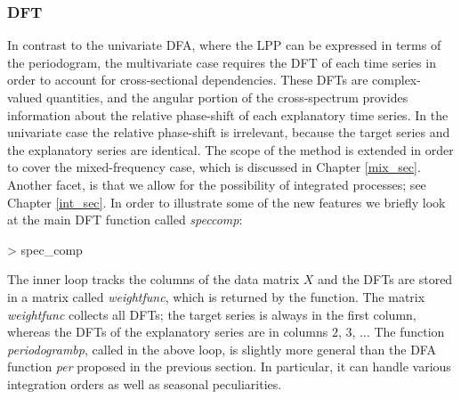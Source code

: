 \documentclass[a4paper]{book}
\begin{document}
\subsubsection{DFT}

In contrast to the univariate DFA, where the LPP can be expressed in terms of  the periodogram, the multivariate case 
 requires the   DFT of each time series in order to account for cross-sectional dependencies.  These DFTs are complex-valued
 quantities, and the angular portion of the cross-spectrum provides information about the relative phase-shift of each explanatory time series. 
  In the univariate case the relative phase-shift is irrelevant, because the target series and the explanatory series are identical.
 The scope of the method is extended in order to cover the mixed-frequency case, which is discussed in Chapter \ref{mix_sec}. 
 Another facet, is that we allow for the possibility of integrated processes; see Chapter \ref{int_sec}. 
 In order to illustrate some of the new features we briefly look at the main DFT function called {\em spec\textunderscore comp}:
\begin{Schunk}
\begin{Sinput}
> spec_comp
\end{Sinput}
\end{Schunk}
The inner loop   tracks the columns of the data matrix $X$ and the DFTs are stored in a matrix called \emph{weight\textunderscore func},
  which is returned by the function. The matrix \emph{weight\textunderscore func} collects all DFTs;
  the target series is always in the first column, whereas the DFTs of the explanatory series are in columns $2$, $3$, $\ldots$
 The function \emph{periodogram\textunderscore bp}, called in the above loop, is slightly more general than the DFA 
function \emph{per} proposed in the previous section. In particular, it can handle various integration orders as well as
 seasonal peculiarities. 
\end{document}
